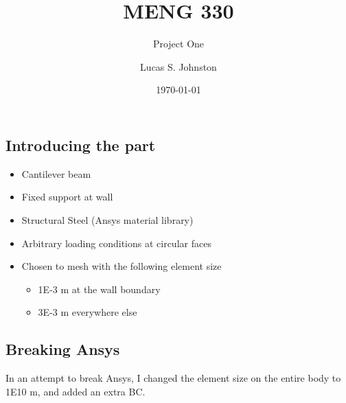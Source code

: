 \documentclass[11pt]{beamer}
\title{MENG 330}
\subtitle{Project One}
\author{Lucas S. Johnston}
\date{\today}
\begin{document}
    \maketitle
    
    \begin{frame}
    \section{Introducing the part}
        \begin{itemize}
            \item Cantilever beam
            \item Fixed support at wall
            \item Structural Steel (Ansys material library)
            \item Arbitrary loading conditions at circular faces
            \item Chosen to mesh with the following element size
            \begin{itemize}
                \item 1E-3 m at the wall boundary
                \item 3E-3 m everywhere else
            \end{itemize}
        \end{itemize}
    \end{frame}
    
    \begin{frame}
    \section{Breaking Ansys}
        In an attempt to break Ansys, I changed the element size on the entire body to 1E10 m, and added an extra BC.
    \end{frame}
\end{document}
